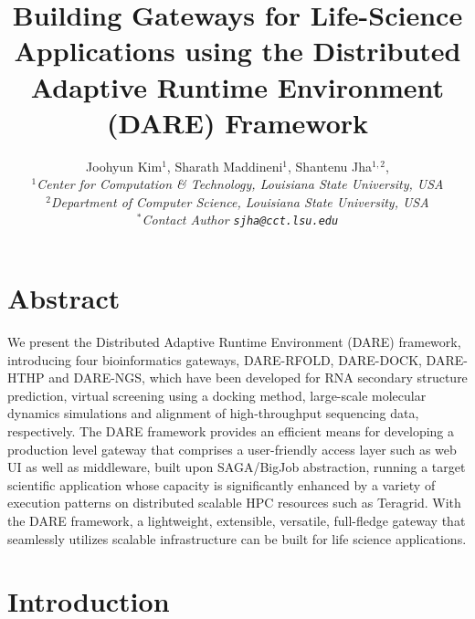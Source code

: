 \documentclass[12pt]{article}
\begin{document}

\title{Building Gateways for Life-Science Applications using the
  Distributed Adaptive Runtime Environment (DARE) Framework}

\author{Joohyun Kim$^{1}$, Sharath Maddineni$^{1}$, Shantenu Jha$^{1,2}$, \\
  \small{\emph{$^{1}$Center for Computation \& Technology, Louisiana State University, USA}}\\
  \small{\emph{$^{2}$Department of Computer Science, Louisiana State University, USA}}\\
  \small{\emph{$^{*}$Contact Author \texttt{sjha@cct.lsu.edu}}} }

\maketitle

\section*{Abstract}
We present the Distributed Adaptive Runtime Environment (DARE)
framework, introducing four bioinformatics gateways, DARE-RFOLD,
DARE-DOCK, DARE-HTHP and DARE-NGS, which have been developed for RNA
secondary structure prediction, virtual screening using a docking
method, large-scale molecular dynamics simulations and alignment of high-throughput sequencing data,
respectively.  The DARE framework provides an efficient means for developing a production level gateway
that comprises a user-friendly access layer such as web UI as well as middleware, built upon SAGA/BigJob abstraction, running a target
scientific application whose capacity is significantly enhanced by a variety of
execution patterns on distributed scalable HPC resources such as Teragrid.  With the DARE framework, a lightweight, extensible, versatile, full-fledge gateway that seamlessly utilizes scalable infrastructure can be built for life science applications. 


\section{Introduction}

% 
% 
\end{document}
